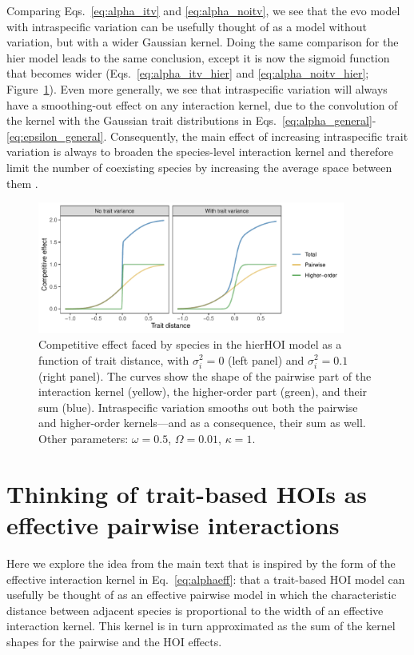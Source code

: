 \documentclass[10pt]{article}
\begin{document}
Comparing Eqs.~\ref{eq:alpha_itv} and \ref{eq:alpha_noitv}, we see that the evo model with intraspecific variation can be usefully thought of as a model without variation, but with a wider Gaussian kernel. Doing the same comparison for the hier model leads to the same conclusion, except it is now the sigmoid function that becomes wider (Eqs.~\ref{eq:alpha_itv_hier} and \ref{eq:alpha_noitv_hier}; Figure~\ref{fig:hiereffect}). Even more generally, we see that intraspecific variation will always have a smoothing-out effect on any interaction kernel, due to the convolution of the kernel with the Gaussian trait distributions in Eqs.~\ref{eq:alpha_general}-\ref{eq:epsilon_general}. Consequently, the main effect of increasing intraspecific trait variation is always to broaden the species-level interaction kernel and therefore limit the number of coexisting species by increasing the average space between them \citep{barabas_effect_2016}.

\begin{figure}[!ht]
  \centering
  \includegraphics[width=0.9\textwidth]{hier_comp_effect.pdf}
  \caption{Competitive effect faced by species in the hierHOI model as a function of trait distance, with $\sigma_i^2 = 0$ (left panel) and $\sigma_i^2 = 0.1$ (right panel). The curves show the shape of the pairwise part of the interaction kernel (yellow), the higher-order part (green), and their sum (blue). Intraspecific variation smooths out both the pairwise and higher-order kernels---and as a consequence, their sum as well. Other parameters: $\omega = 0.5$, $\Omega = 0.01$, $\kappa = 1$.}
  \label{fig:hiereffect}
\end{figure}


\section{Thinking of trait-based HOIs as effective pairwise interactions}

Here we explore the idea from the main text that is inspired by the form of the effective interaction kernel in Eq.~\ref{eq:alphaeff}: that a trait-based HOI model can usefully be thought of as an effective pairwise model in which the characteristic distance between adjacent species is proportional to the width of an effective interaction kernel. This kernel is in turn approximated as the sum of the kernel shapes for the pairwise and the HOI effects.
\end{document}
